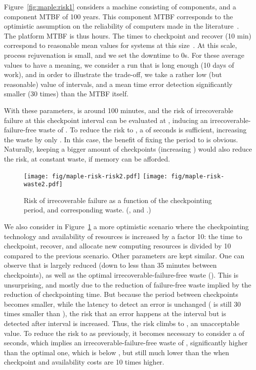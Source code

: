 \documentclass[10pt,table]{article}
\begin{document}
Figure~\ref{fig:maple:risk1} considers a machine consisting of 
components, and a component MTBF of 100 years. This component MTBF
corresponds to the optimistic assumption on the reliability of
computers made in the literature~\cite{IESP-toward,IESP-Exascale}.
The platform MTBF  is thus 
hours.  The times to checkpoint and recover (10 min) correspond to
reasonable mean values for systems at this
size~\cite{c178,Ferreira2011}. At this scale, process rejuvenation is
small, and we set the downtime to 0s. For these average values to have a
meaning, we consider a run that is long enough (10 days of work), and
in order to illustrate the trade-off, we take a rather low (but
reasonable) value  of intervals, and a mean time error
detection  significantly smaller (30 times) than the MTBF 
itself.

With these parameters,  is around 100 minutes, and the
risk of irrecoverable failure at this checkpoint interval can be evaluated
at , inducing an irrecoverable-failure-free waste of . To
reduce the risk to , a  of  seconds is sufficient,
increasing the waste by only . In this case, the benefit of
fixing the period to  is obvious. Naturally,
keeping a bigger amount of checkpoints (increasing ) would also
reduce the risk, at constant waste, if memory can be afforded.

\begin{figure}
\begin{center}
\texttt{[image: fig/maple-risk-risk2.pdf]}
\texttt{[image: fig/maple-risk-waste2.pdf]}
\caption{Risk of irrecoverable failure as a function of the checkpointing
  period, and corresponding waste. {\footnotesize(,  and .)}}
\vspace{-.6cm}
\label{fig:maple:risk2}
\end{center}
\end{figure}

We also consider in Figure~\ref{fig:maple:risk2} a more optimistic scenario where the
checkpointing technology and availability of resources is increased by
a factor 10: the time to checkpoint, recover, and allocate new
computing resources is divided by 10 compared to the previous
scenario. Other parameters are kept similar. One can observe that
 is largely reduced (down to less than 35 minutes between checkpoints), 
as well as the optimal irrecoverable-failure-free waste (). 
This is unsurprising, and mostly due to the reduction of
failure-free waste implied by the reduction of checkpointing time. But
because the period between checkpoints becomes smaller, while the
latency to detect an error is unchanged ( is still 30 times smaller than
 ), the risk that an error happens at the
interval  but is detected after interval  is increased. Thus,
the risk climbs to , an unacceptable value. To reduce the risk
to  as previously, it becomes necessary to consider a
 of  seconds, which implies an irrecoverable-failure-free waste of ,
significantly higher than the optimal one, which is  below , but still
much lower than the  when checkpoint and
availability costs are 10 times higher.
\end{document}
